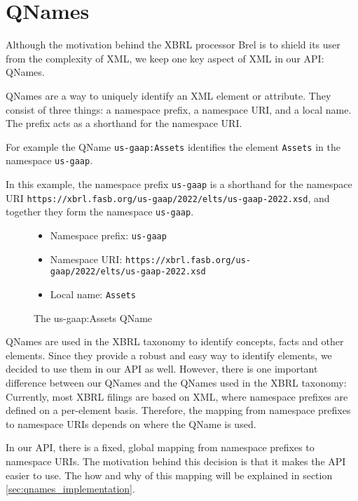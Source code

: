 \section{QNames}
\label{sec:qnames}

Although the motivation behind the XBRL processor Brel is to shield its user from the complexity of XML, 
we keep one key aspect of XML in our API: QNames.

QNames are a way to uniquely identify an XML element or attribute. 
They consist of three things: a namespace prefix, a namespace URI, and a local name.
The prefix acts as a shorthand for the namespace URI.

For example the QName \texttt{us-gaap:Assets} identifies the element \texttt{Assets} in the namespace \texttt{us-gaap}.

In this example, the namespace prefix \texttt{us-gaap} is a shorthand for the namespace URI \texttt{https://xbrl.fasb.org/us-gaap/2022/elts/us-gaap-2022.xsd}, 
and together they form the namespace \texttt{us-gaap}.

\begin{figure}[H]
    \caption{The us-gaap:Assets QName}
    \label{fig:qname_us_gaap_assets}
    \begin{itemize}
        \item Namespace prefix: \texttt{us-gaap}
        \item Namespace URI: \texttt{https://xbrl.fasb.org/us-gaap/2022/elts/us-gaap-2022.xsd}
        \item Local name: \texttt{Assets}
    \end{itemize}
\end{figure}

QNames are used in the XBRL taxonomy to identify concepts, facts and other elements. Since they provide a robust and easy way to identify elements,
we decided to use them in our API as well. However, there is one important difference between our QNames and the QNames used in the XBRL taxonomy:
Currently, most XBRL filings are based on XML, where namespace prefixes are defined on a per-element basis.
Therefore, the mapping from namespace prefixes to namespace URIs depends on where the QName is used. 

In our API, there is a fixed, global mapping from namespace prefixes to namespace URIs.
The motivation behind this decision is that it makes the API easier to use.
The how and why of this mapping will be explained in section \ref{sec:qnames_implementation}.



